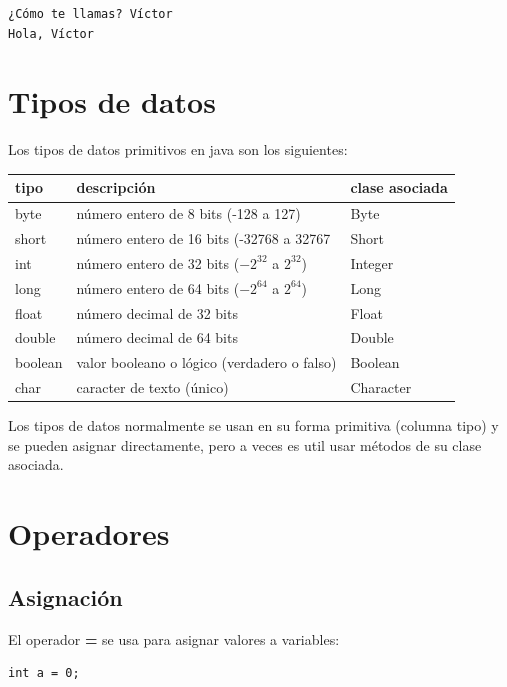\documentclass[11pt]{article}
\begin{document}
\begin{verbatim}
¿Cómo te llamas? Víctor
Hola, Víctor
\end{verbatim}

\section{Tipos de datos}
\label{sec:org7eb93d2}
Los tipos de datos primitivos en java son los siguientes:
\begin{center}
\begin{tabular}{lll}
tipo & descripción & clase asociada\\
\hline
byte & número entero de 8 bits (-128 a 127) & Byte\\
short & número entero de 16 bits (-32768 a 32767 & Short\\
int & número entero de 32 bits (\(-2^{32}\) a \(2^{32}\)) & Integer\\
long & número entero de 64 bits (\(-2^{64}\) a \(2^{64}\)) & Long\\
float & número decimal de 32 bits & Float\\
double & número decimal de 64 bits & Double\\
boolean & valor booleano o lógico (verdadero o falso) & Boolean\\
char & caracter de texto (único) & Character\\
\end{tabular}
\end{center}


Los tipos de datos normalmente se usan en su forma primitiva (columna tipo) y se pueden asignar directamente, pero a veces es util usar métodos de su clase asociada.
\section{Operadores}
\label{sec:org9bd6e5b}
\subsection{Asignación}
\label{sec:org8c05ba3}
El operador \textbf{=} se usa para asignar valores a variables:
\begin{verbatim}
int a = 0;
\end{verbatim}
\end{document}
